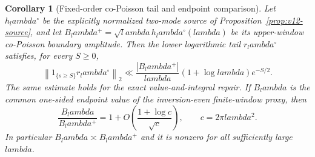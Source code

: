 \documentclass[11pt]{article}
\def\lambda{lambda}%
\newtheorem{corollary}[theorem]{Corollary}
\theoremstyle{remark}
\begin{document}
\begin{corollary}[Fixed-order co-Poisson tail and endpoint comparison]\label{cor:pswf-cross-tail}
Let $h_\lambda^{\circ}$ be the explicitly normalized two-mode source of
Proposition~\ref{prop:v12-source}, and let
$B_\lambda^{+}=\sqrt\lambda\,h_\lambda^{\circ}(\lambda)$ be its upper-window co-Poisson boundary amplitude.  Then the lower logarithmic tail $r_\lambda^{\circ}$ satisfies, for every $S\ge0$,
\begin{equation}\label{eq:lower-tail-l2}
 \left\|1_{\{s\ge S\}}r_\lambda^{\circ}\right\|_2
 \ll \frac{|B_\lambda^{+}|}{\lambda}(1+\log\lambda)e^{-S/2}.
\end{equation}
The same estimate holds for the exact value-and-integral repair. If
$B_\lambda$ is the common one-sided endpoint value of the inversion-even
finite-window proxy, then
\begin{equation}\label{eq:v13-endpoint-comparison}
 \frac{B_\lambda}{B_\lambda^+}
 =1+O\!\left(\frac{1+\log c}{\sqrt c}\right),
 \qquad c=2\pi\lambda^2.
\end{equation}
In particular $B_\lambda\asymp B_\lambda^+$ and it is nonzero for all
sufficiently large $\lambda$.
\end{corollary}
\end{document}
